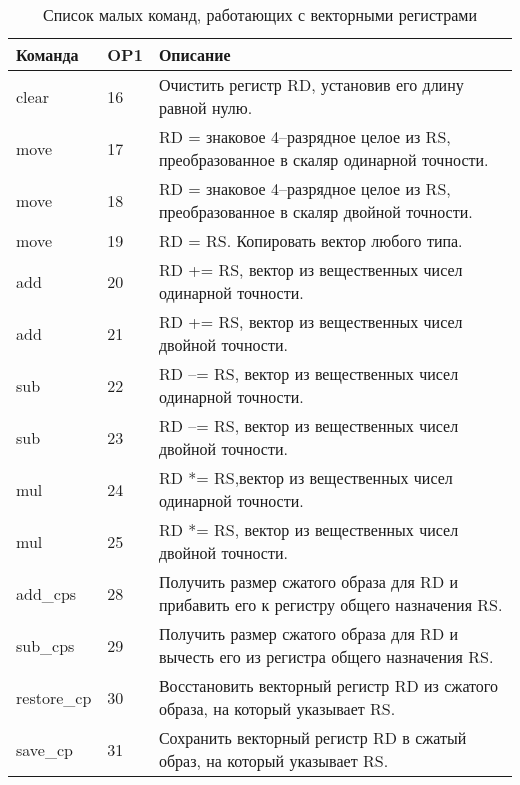 \documentclass[forwardcom.tex]{subfiles}
\begin{document}
\begin{longtable} {|p{20mm}|p{8mm}|p{100mm}|}
\caption{Список малых команд, работающих с векторными регистрами}
\label{table:tinyInstructionsVector}  \\
\endfirsthead
\endhead
\hline
\bfseries Команда & \bfseries OP1 & \bfseries Описание                                                                     \\ \hline
clear             & 16            & Очистить регистр RD, установив его длину равной нулю.                                  \\
move              & 17            & RD = знаковое 4--разрядное целое из RS, преобразованное в скаляр одинарной точности.   \\
move              & 18            & RD = знаковое 4--разрядное целое из RS, преобразованное в скаляр двойной точности.     \\
move              & 19            & RD = RS. Копировать вектор любого типа.                                                \\
add               & 20            & RD += RS, вектор из вещественных чисел одинарной точности.                             \\
add               & 21            & RD += RS, вектор из вещественных чисел двойной точности.                               \\
sub               & 22            & RD --= RS, вектор из вещественных чисел одинарной точности.                            \\
sub               & 23            & RD --= RS, вектор из вещественных чисел двойной точности.                              \\
mul               & 24            & RD *= RS,вектор из вещественных чисел одинарной точности.                              \\
mul               & 25            & RD *= RS, вектор из вещественных чисел двойной точности.                               \\
add\_cps          & 28            & Получить размер сжатого образа для RD и прибавить его к регистру общего назначения RS. \\
sub\_cps          & 29            & Получить размер сжатого образа для RD и вычесть его из регистра общего назначения RS.  \\
restore\_cp       & 30            & Восстановить векторный регистр RD из сжатого образа, на который указывает RS.          \\
save\_cp          & 31            & Сохранить векторный регистр RD в сжатый образ, на который указывает RS.                \\ \hline
\end{longtable}
\end{document}
